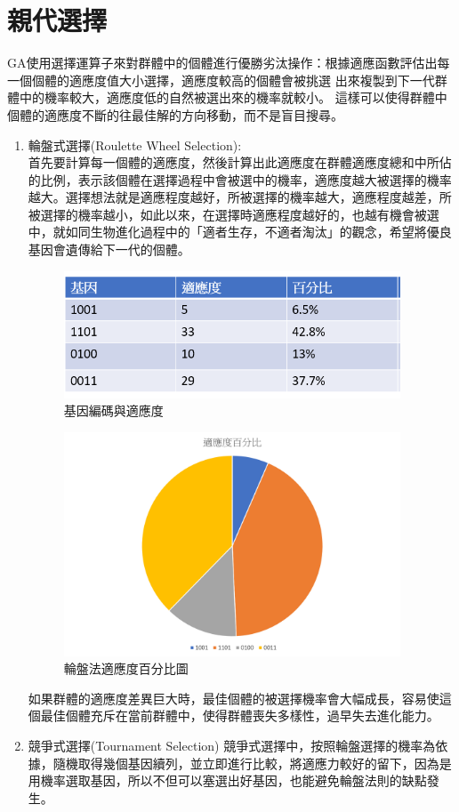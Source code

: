 \section{親代選擇}
GA使用選擇運算子來對群體中的個體進行優勝劣汰操作：根據適應函數評估出每一個個體的適應度值大小選擇，適應度較高的個體會被挑選 出來複製到下一代群體中的機率較大，適應度低的自然被選出來的機率就較小。 這樣可以使得群體中個體的適應度不斷的往最佳解的方向移動，而不是盲目搜尋。

         \begin{enumerate}
        \item 
       輪盤式選擇(Roulette Wheel Selection):\\
       首先要計算每一個體的適應度，然後計算出此適應度在群體適應度總和中所佔的比例，表示該個體在選擇過程中會被選中的機率，適應度越大被選擇的機率越大。選擇想法就是適應程度越好，所被選擇的機率越大，適應程度越差，所被選擇的機率越小，如此以來，在選擇時適應程度越好的，也越有機會被選中，就如同生物進化過程中的「適者生存，不適者淘汰」的觀念，希望將優良基因會遺傳給下一代的個體。
                \begin{figure}[H]
            \centerline{\includegraphics[width=10cm]{pic/Wheel.PNG}}
            \caption{基因編碼與適應度}
            \label{fig:wheel}
        \end{figure}
                 \begin{figure}[H]
            \centerline{\includegraphics[width=10cm]{pic/wheelFitness.png}}
            \caption{輪盤法適應度百分比圖}
            \label{fig:wheelf}
        \end{figure}
        如果群體的適應度差異巨大時，最佳個體的被選擇機率會大幅成長，容易使這個最佳個體充斥在當前群體中，使得群體喪失多樣性，過早失去進化能力。
       
       \item  
       競爭式選擇(Tournament Selection) 
        競爭式選擇中，按照輪盤選擇的機率為依據，隨機取得幾個基因續列，並立即進行比較，將適應力較好的留下，因為是用機率選取基因，所以不但可以塞選出好基因，也能避免輪盤法則的缺點發生。
        \end{enumerate}

